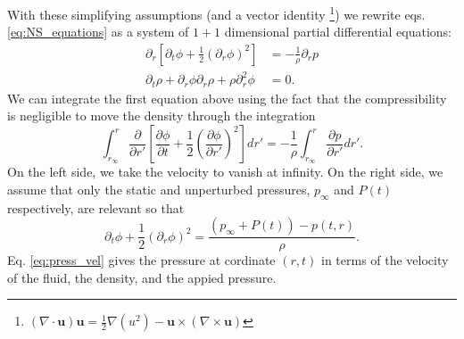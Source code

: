 \documentclass[rmp,aps,nofootinbib,superscriptaddress,floatfix,10pt]{revtex4-2}
\begin{document}
With these simplifying assumptions (and a vector identity \footnote{$\left( \nabla \cdot \bm{u} \right) \bm{u} = \frac{1}{2} \nabla (u^2) - \bm{u}\times \left( \nabla \times \bm{u} \right)$}) we rewrite eqs. \ref{eq:NS_equations} as a system of $1+1$ dimensional partial differential equations: 
\begin{equation}
\begin{split}
     \partial_r \left[ \partial_t \phi +\frac{1}{2} \left( \partial_r \phi \right)^2 \right] & = - \frac{1}{\rho} \partial_r p  \\ 
     \partial_t \rho+ \partial_r \phi \partial_r \rho + \rho \partial^2_r \phi & = 0.
     \label{eq:NS_1D}
\end{split}
\end{equation}
We can integrate the first equation above using the fact that the compressibility is negligible to move the density through the integration \cite{leighton2007derivation}
\begin{equation}
    \int_{r_\infty}^{r} \frac{\partial}{\partial r'} \left[ \frac{\partial \phi}{\partial t} +\frac{1}{2} \left( \frac{\partial \phi}{\partial r'} \right)^2 \right] dr' = - \frac{1}{\rho} \int_{r_\infty}^{r} \frac{\partial p}{\partial r'} dr'.
\end{equation}
On the left side, we take the velocity to vanish at infinity. On the right side, we assume that only the static and unperturbed pressures, $p_\infty$ and $P(t)$ respectively, are relevant so that \cite{prosperetti1999old,prosperetti1986bubble,leighton2007derivation} 
\begin{equation}
    \partial_t \phi + \frac{1}{2}\left( \partial_r \phi \right)^2 = \frac{(p_\infty+P(t))-p(t,r)}{\rho}.
    \label{eq:press_vel}
\end{equation}
Eq. \ref{eq:press_vel} gives the pressure at cordinate $(r,t)$ in terms of the velocity of the fluid, the density, and the appied pressure. 
\end{document}
